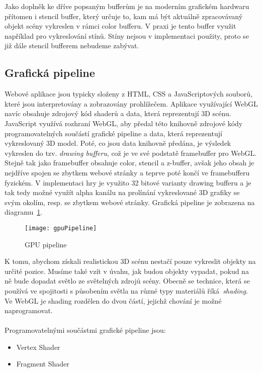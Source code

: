 Jako doplněk ke dříve popsaným bufferům je na moderním grafickém hardwaru přítomen i stencil buffer, který určuje to, kam má být aktuálně zpracovávaný objekt scény vykreslen v rámci color bufferu. V praxi je tento buffer využit například pro vykreslování stínů. Stíny nejsou v implementaci použity, proto se již dále stencil bufferem nebudeme zabývat.

\subsection*{Grafická pipeline}
\label{subsection:pipeline}
Webové aplikace jsou typicky složeny z HTML, CSS a JavaScriptových souborů, které jsou interpretovány a zobrazovány prohlížečem. Aplikace využívající WebGL navíc obsahuje zdrojový kód shaderů a data, která reprezentují 3D scénu. JavaScript využívá rozhraní WebGL, aby předal této knihovně zdrojové kódy programovatelných součástí grafické pipeline a data, která reprezentují vykreslovaný 3D model. Poté, co jsou data knihovně předána, je výsledek vykreslen do tzv. \textit{drawing bufferu}, což je ve své podstatě framebuffer pro WebGL. Stejně tak jako framebuffer obsahuje color, stencil a z-buffer, avšak jeho obsah je nejdříve spojen se zbytkem webové stránky a teprve poté končí ve framebufferu fyzickém. V implementaci hry je využito 32 bitové varianty drawing bufferu a je tak tedy možné využít alpha kanálu na prolínání vykreslované 3D grafiky se svým okolím, resp. se zbytkem webové stránky. Grafická pipeline je zobrazena na diagramu~\ref{fig:gpuPipeline}.

\begin{figure}[htb]
\centering
\texttt{[image: gpuPipeline]}
\caption{GPU pipeline}
\label{fig:gpuPipeline}
\end{figure}

K tomu, abychom získali realistickou 3D scénu nestačí pouze vykreslit objekty na určité pozice. Musíme také vzít v úvahu, jak budou objekty vypadat, pokud na ně bude dopadat světlo ze světelných zdrojů scény. Obecně se technice, která se používá ve spojitosti s působením světla na různé typy materiálů říká~\textit{shading}. Ve WebGL je shading rozdělen do dvou částí, jejichž chování je možné naprogramovat. \\ \\ Programovatelnými součástmi grafické pipeline jsou:
\begin{itemize}
\item Vertex Shader
\item Fragment Shader
\end{itemize}

